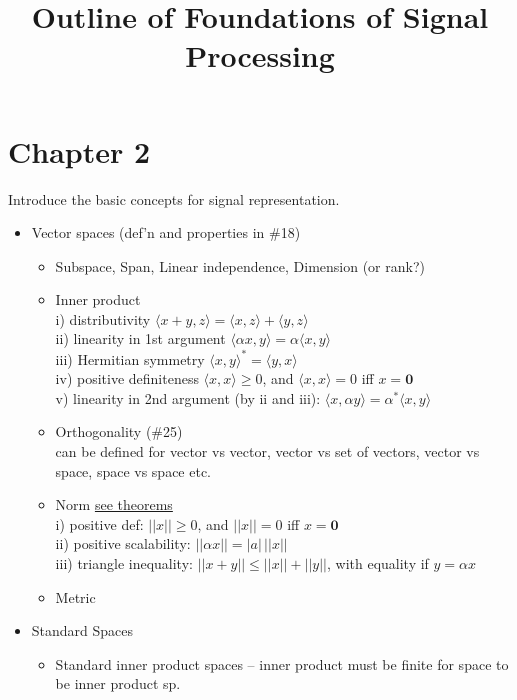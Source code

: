 \documentclass{article}
\newcommand{\la}{\langle}
\newcommand{\ra}{\rangle}
\begin{document}
\title{\bf Outline of Foundations of Signal Processing}
\maketitle
\section*{Chapter 2}
Introduce the basic concepts for signal representation. 
\begin{itemize}
\item Vector spaces (def'n and properties in \#18)
	\begin{itemize}
	\item Subspace, Span, Linear independence, Dimension (or rank?)
	\item Inner product \\
	{\color{gray}
	\footnotesize
	i) distributivity $\la x+y,z \ra=\la x,z \ra + \la y,z \ra$\\
	ii) linearity in 1st argument $\la \alpha x,y \ra = \alpha \la x,y \ra$\\
	iii) Hermitian symmetry $\la x, y \ra^{*}=\la y,x \ra$\\
	iv) positive definiteness $\la x,x \ra\ge 0$, and $\la x,x \ra=0$ iff $x=\mathbf{0}$\\
	v) linearity in 2nd argument (by ii and iii): $\la x, \alpha y \ra = \alpha^{*}\la x,y \ra$
	}
	\item Orthogonality (\#25) \\
	{\footnotesize\color{gray}
	can be defined for vector vs vector, vector vs set of vectors, vector vs space, space vs space etc.
	}
	\item Norm \hyperref[nomr_thms]{see theorems}\\
	{\footnotesize \color{gray}
	i) positive def: $||x||\ge 0$, and $||x||=0$ iff $x=\mathbf{0}$\\
	ii) positive scalability: $||\alpha x||=|a|\,||x||$\\
	iii) triangle inequality: $||x+y|| \le ||x||+||y||$, with equality if $y=\alpha x$
	}
	\item Metric
	\end{itemize}
\item Standard Spaces
	\begin{itemize}
	\item Standard inner product spaces -- {\color{gray} inner product must be finite for space to be inner product sp.}

\end{itemize}
\end{itemize}
\end{document}
